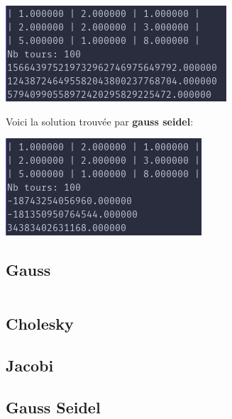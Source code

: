 \documentclass[a4paper]{article}
\begin{document}
\includegraphics[scale=0.5]{./img/jacobi/jac_ex_3.png}

Voici la solution trouvée par \textbf{gauss seidel}:

\includegraphics[scale=0.5]{./img/gauss_seidel/g_e_fail.png}

\clearpage


\begin{appendix}
  \section*{Gauss}

  \begin{lstlisting}

  \end{lstlisting}
\end{appendix}
\clearpage


\begin{appendix}
  \section*{Cholesky}
  
\end{appendix}
\clearpage


\begin{appendix}
  \section*{Jacobi}
  
\end{appendix}
\clearpage


\begin{appendix}
  \section*{Gauss Seidel}
    
\end{appendix}
\end{document}
